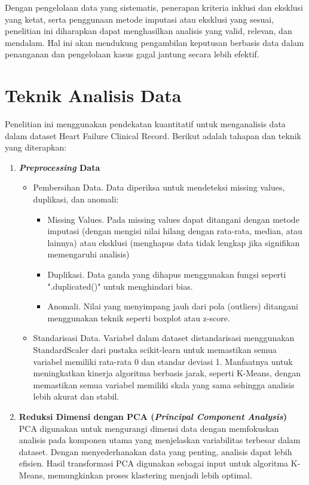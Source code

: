 \documentclass[english,12pt,a4paper,openany]{book}
\begin{document}
	Dengan pengelolaan data yang sistematis, penerapan kriteria inklusi dan eksklusi yang ketat, serta penggunaan metode imputasi atau eksklusi yang sesuai, penelitian ini diharapkan dapat menghasilkan analisis yang valid, relevan, dan mendalam. Hal ini akan mendukung pengambilan keputusan berbasis data dalam penanganan dan pengelolaan kasus gagal jantung secara lebih efektif.
	
	
	\section{Teknik Analisis Data}
	Penelitian ini menggunakan pendekatan kuantitatif untuk menganalisis data dalam dataset Heart Failure Clinical Record. Berikut adalah tahapan dan teknik yang diterapkan:
	\begin{enumerate}
		\item \textbf{\textit{Preprocessing} Data}
		\begin{itemize}
			\item Pembersihan Data. Data diperiksa untuk mendeteksi missing values, duplikasi, dan anomali:
			\begin{itemize}
				\item Missing Values. Pada missing values dapat ditangani dengan metode imputasi (dengan mengisi nilai  hilang dengan rata-rata, median, atau lainnya) atau eksklusi (menghapus data tidak lengkap jika signifikan memengaruhi analisis)
				\item Duplikasi. Data  ganda yang dihapus menggunakan fungsi seperti ".duplicated()" untuk menghindari bias.
				\item Anomali. Nilai yang menyimpang jauh dari pola (outliers) ditangani menggunakan teknik seperti boxplot atau z-score.
			\end{itemize}
			\item Standarisasi Data. Variabel dalam dataset distandarisasi menggunakan StandardScaler dari pustaka scikit-learn untuk memastikan semua variabel memiliki rata-rata 0 dan standar deviasi 1. Manfaatnya untuk meningkatkan kinerja algoritma berbasis jarak, seperti K-Means,  dengan memastikan semua variabel memiliki skala yang sama sehingga analisis lebih akurat dan stabil. 
		\end{itemize}
		\item \textbf{Reduksi Dimensi dengan PCA (\textit{Principal Component Analysis})}\\
		PCA digunakan untuk mengurangi dimensi data dengan memfokuskan analisis pada komponen utama yang menjelaskan variabilitas terbesar dalam dataset. Dengan menyederhanakan data yang penting, analisis dapat lebih efisien. Hasil transformasi PCA digunakan sebagai input untuk algoritma K-Means, memungkinkan proses klastering menjadi lebih optimal. 
		

\end{enumerate}
\end{document}
